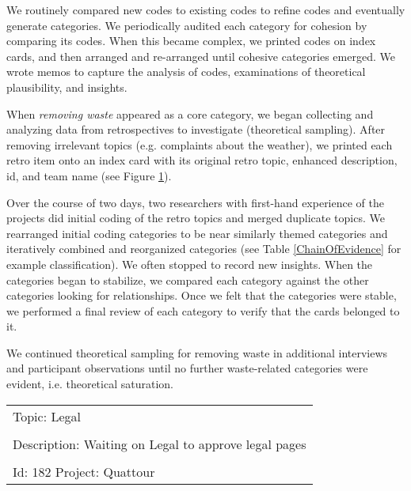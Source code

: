We routinely compared new codes to existing codes to refine codes and eventually generate categories. We periodically audited each category for cohesion by comparing its codes. When this became complex, we printed codes on index cards, and then arranged and re-arranged until cohesive categories emerged. We wrote memos to capture the analysis of codes, examinations of theoretical plausibility, and insights.


When \textit{removing waste} appeared as a core category, we began collecting and analyzing data from retrospectives to investigate (theoretical sampling). After removing irrelevant topics (e.g. complaints about the weather), we printed each retro item onto an index card with its original retro topic, enhanced description, id, and team name (see Figure \ref{exampleRetroTopicl}).


Over the course of two days, two researchers with first-hand experience of the projects did initial coding of the retro topics and merged duplicate topics. We rearranged initial coding categories to be near similarly themed categories and iteratively combined and reorganized categories (see Table \ref{ChainOfEvidence} for example classification). We often stopped to record new insights. When the categories began to stabilize, we compared each category against the other categories looking for relationships. Once we felt that the categories were stable, we performed a final review of each category to verify that the cards belonged to it. 


We continued theoretical sampling for removing waste in additional interviews and participant observations until no further waste-related categories were evident, i.e. theoretical saturation. 




\begin{table}[t]
\renewcommand{\arraystretch}{1.5}
\centering
{}
\label{exampleRetroTopicl}
\begin{tabular}{|l|}
\hline
Topic: Legal \\ \\ Description: Waiting on Legal to approve legal pages \\ \\ Id: 182 Project: Quattour\\ \hline
\end{tabular}
\end{table}














